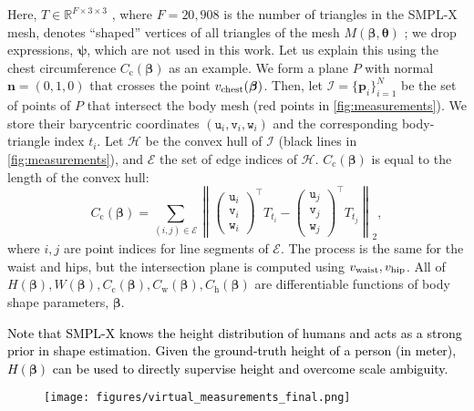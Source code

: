 \documentclass[10pt,twocolumn,letterpaper]{article}
\newcommand{\smplx}{\mbox{SMPL-X}\xspace}
\newcommand{\mesh}{M}
\newcommand{\shape}{\bm{\beta}}
\newcommand{\pose}{\bm{\theta}}
\newcommand{\expression}{\bm{\psi}}
\newcommand{\norm}[1]{\left\lVert#1\right\rVert}
\newcommand{\height}{H}
\newcommand{\weight}{W}
\newcommand{\heightArg}{\height(\shape)}
\newcommand{\weightArg}{\weight(\shape)}
\newcommand{\chestCirc}{C_{\text{c}}}
\newcommand{\waistCirc}{C_{\text{w}}}
\newcommand{\hipsCirc}{C_{\text{h}}}
\newcommand{\chestCircArg}{\chestCirc(\shape)}
\newcommand{\waistCircArg}{\waistCirc(\shape)}
\newcommand{\hipsCircArg}{\hipsCirc(\shape)}
\newcommand{\cameraready}[1]{\textcolor{Fuchsia}{{#1}}\xspace}
\renewcommand{\cameraready}[1]{\textcolor{black}{{#1}}\xspace}
\newcommand{\hulledgeindices}[0]{\mathcal{E}}
\begin{document}
\begin{appendices}
Here, $T \in \mathbb{R}^{F \times 3 \times 3}$
, where $F=20,908$ is the number of triangles in the \smplx mesh,
denotes ``shaped'' vertices of all triangles of the mesh $\mesh(\shape, \pose)$
;  we drop expressions, $\expression$, which are not used in this work.
Let us explain this using the chest circumference $\chestCircArg$ as an example.
We form a plane $P$ with normal $\bm{n}=(0, 1, 0)$
that crosses the point $\chestvertex(\shape)$.
Then, let
$\mathcal{I} = \{\bm{p}_i\}_{i=1}^{N}$
be the set of points of $P$ that intersect the body mesh (red points in \cref{fig:measurements}).
We store their barycentric coordinates $(\mathtt{u}_i, \mathtt{v}_i, \mathtt{w}_i)$ and the corresponding body-triangle index $t_i$.
Let $\mathcal{H}$ be the convex hull of $\mathcal{I}$ (black lines in \cref{fig:measurements}),
and $\hulledgeindices$
the set of edge indices of $\mathcal{H}$.
$\chestCircArg$ is equal to the length of the convex hull:
\begin{equation}
    \chestCircArg = \sum_{(i, j) \in \hulledgeindices}\norm{
        \begin{pmatrix}
            \mathtt{u}_i \\
            \mathtt{v}_i \\
            \mathtt{w}_i
        \end{pmatrix}^\top T_{t_i} -
        \begin{pmatrix}
            \mathtt{u}_j \\
            \mathtt{v}_j \\
            \mathtt{w}_j
        \end{pmatrix}^\top T_{t_j}
    }_2,
    \label{eq:circumference}
\end{equation}
where $i,j$ are point indices for line segments of $\hulledgeindices$. The process is the same for the waist and hips, but the intersection plane
is computed using $v_{\text{waist}}, v_{\text{hip}}$.
All of $\heightArg, \weightArg, \chestCircArg, \waistCircArg, \hipsCircArg$ are differentiable functions of body shape parameters, $\shape$.

\cameraready{Note that \smplx knows the height distribution of humans and acts as a strong prior in shape estimation. Given the ground-truth height of a person (in meter), $\heightArg$ can be used to directly supervise height and overcome scale ambiguity.}

\begin{figure}
    \centering \texttt{[image: figures/virtual\_measurements\_final.png]}
    

\end{figure}
\end{appendices}
\end{document}
